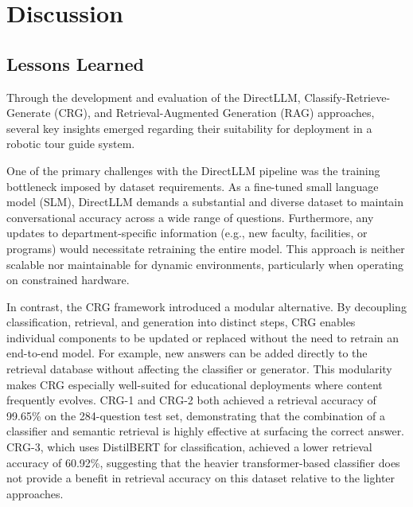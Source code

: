 \documentclass[conference]{IEEEtran}
\begin{document}

\section{Discussion}
\subsection{Lessons Learned}
Through the development and evaluation of the DirectLLM, Classify-Retrieve-Generate (CRG), and Retrieval-Augmented Generation (RAG) approaches, several key insights emerged regarding their suitability for deployment in a robotic tour guide system.

One of the primary challenges with the DirectLLM pipeline was the training bottleneck imposed by dataset requirements. 
As a fine-tuned small language model (SLM), DirectLLM demands a substantial and diverse dataset to maintain conversational accuracy across a wide range of questions. 
Furthermore, any updates to department-specific information (e.g., new faculty, facilities, or programs) would necessitate retraining the entire model. 
This approach is neither scalable nor maintainable for dynamic environments, particularly when operating on constrained hardware.

In contrast, the CRG framework introduced a modular alternative. 
By decoupling classification, retrieval, and generation into distinct steps, CRG enables individual components to be updated or replaced without the need to retrain an end-to-end model. 
For example, new answers can be added directly to the retrieval database without affecting the classifier or generator. 
This modularity makes CRG especially well-suited for educational deployments where content frequently evolves.
CRG-1 and CRG-2 both achieved a retrieval accuracy of 99.65\% on the 284-question test set, demonstrating that the combination of a classifier and semantic retrieval is highly effective at surfacing the correct answer.
CRG-3, which uses DistilBERT for classification, achieved a lower retrieval accuracy of 60.92\%, suggesting that the heavier transformer-based classifier does not provide a benefit in retrieval accuracy on this dataset relative to the lighter approaches.
\end{document}
